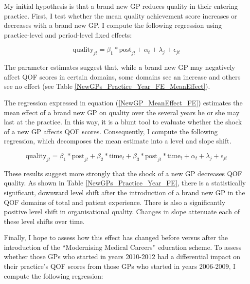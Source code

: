 \documentclass[11pt]{article}
\begin{document}
My initial hypothesis is that a brand new GP reduces quality in their entering practice. First, I test whether the mean quality achievement score increases or decreases with a brand new GP. I compute the following regression using practice-level and period-level fixed effects:

\begin{equation}\label{NewGP_MeanEffect_FE}
  \textrm{quality}_{jt} = \beta_{1}*\textrm{post}_{jt} + \alpha_{t} + \lambda_{j} + \epsilon_{jt}
\end{equation}

The parameter estimates suggest that, while a brand new GP may negatively affect QOF scores in certain domains, some domains see an increase and others see no effect (see Table \ref{NewGPs_Practice_Year_FE_MeanEffect}).

\begin{landscape}

\end{landscape}


The regression expressed in equation (\ref{NewGP_MeanEffect_FE}) estimates the mean effect of a brand new GP on quality over the several years he or she may last at the practice. In this way, it is a blunt tool to evaluate whether the shock of a new GP affects QOF scores. Consequently, I compute the following regression, which decomposes the mean estimate into a level and slope shift.

\begin{equation}\label{NewGP_Decomposed_FE}
  \textrm{quality}_{jt} = \beta_{1}*\textrm{post}_{jt} + \beta_{2}*\textrm{time}_{t} + \beta_{3}*\textrm{post}_{jt}*\textrm{time}_t + \alpha_{t} + \lambda_{j} + \epsilon_{jt}
\end{equation}

These results suggest more strongly that the shock of a new GP decreases QOF quality. As shown in Table \ref{NewGPs_Practice_Year_FE}, there is a statistically significant, downward level shift after the introduction of a brand new GP in the QOF domains of total and patient experience. There is also a significantly positive level shift in organisational quality. Changes in slope attenuate each of these level shifts over time.

\begin{landscape}

\end{landscape}


Finally, I hope to assess how this effect has changed before versus after the introduction of the ``Modernising Medical Careers'' education scheme. To assess whether those GPs who started in years 2010-2012 had a differential impact on their practice's QOF scores from those GPs who started in years 2006-2009, I compute the following regression:
\end{document}

